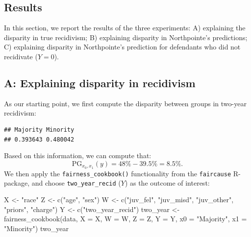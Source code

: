 \documentclass{article}
\newenvironment{Shaded}{\begin{snugshade}}{\end{snugshade}}
\newcommand{\AttributeTok}[1]{\textcolor[rgb]{0.77,0.63,0.00}{#1}}
\newcommand{\FunctionTok}[1]{\textcolor[rgb]{0.00,0.00,0.00}{#1}}
\newcommand{\NormalTok}[1]{#1}
\newcommand{\OtherTok}[1]{\textcolor[rgb]{0.56,0.35,0.01}{#1}}
\newcommand{\SpecialCharTok}[1]{\textcolor[rgb]{0.00,0.00,0.00}{#1}}
\newcommand{\StringTok}[1]{\textcolor[rgb]{0.31,0.60,0.02}{#1}}
\begin{document}
\hypertarget{results}{%
\subsection{Results}\label{results}}

In this section, we report the results of the three experiments: A)
explaining the disparity in true recidivism; B) explaining disparity in
Northpointe's predictions; C) explaining disparity in Northpointe's
prediction for defendants who did not recidivate (\(Y = 0\)).

\hypertarget{a-explaining-disparity-in-recidivism}{%
\subsection{A: Explaining disparity in
recidivism}\label{a-explaining-disparity-in-recidivism}}

As our starting point, we first compute the disparity between groups in
two-year recidivism:

\begin{Shaded}
\end{Shaded}

\begin{verbatim}
## Majority Minority 
## 0.393643 0.480042
\end{verbatim}

Based on this information, we can compute that: \begin{equation}
  \text{PG}_{x_0, x_1}(y) = 48\% - 39.5\% = 8.5\%.
\end{equation} We then apply the \texttt{fairness\_cookbook()}
functionality from the \texttt{faircause} R-package, and choose
\texttt{two\_year\_recid} (\(Y\)) as the outcome of interest:

\begin{Shaded}
\begin{Highlighting}[]
\NormalTok{X }\OtherTok{\textless{}{-}} \StringTok{"race"}
\NormalTok{Z }\OtherTok{\textless{}{-}} \FunctionTok{c}\NormalTok{(}\StringTok{"age"}\NormalTok{, }\StringTok{"sex"}\NormalTok{)}
\NormalTok{W }\OtherTok{\textless{}{-}} \FunctionTok{c}\NormalTok{(}\StringTok{"juv\_fel"}\NormalTok{, }\StringTok{"juv\_misd"}\NormalTok{, }\StringTok{"juv\_other"}\NormalTok{, }\StringTok{"priors"}\NormalTok{, }\StringTok{"charge"}\NormalTok{)}
\NormalTok{Y }\OtherTok{\textless{}{-}} \FunctionTok{c}\NormalTok{(}\StringTok{"two\_year\_recid"}\NormalTok{)}
\NormalTok{two\_year }\OtherTok{\textless{}{-}} \FunctionTok{fairness\_cookbook}\NormalTok{(data, }\AttributeTok{X =}\NormalTok{ X, }\AttributeTok{W =}\NormalTok{ W, }\AttributeTok{Z =}\NormalTok{ Z, }\AttributeTok{Y =}\NormalTok{ Y, }
                              \AttributeTok{x0 =} \StringTok{"Majority"}\NormalTok{, }\AttributeTok{x1 =} \StringTok{"Minority"}\NormalTok{)}
\NormalTok{two\_year}
\end{Highlighting}
\end{Shaded}
\end{document}
